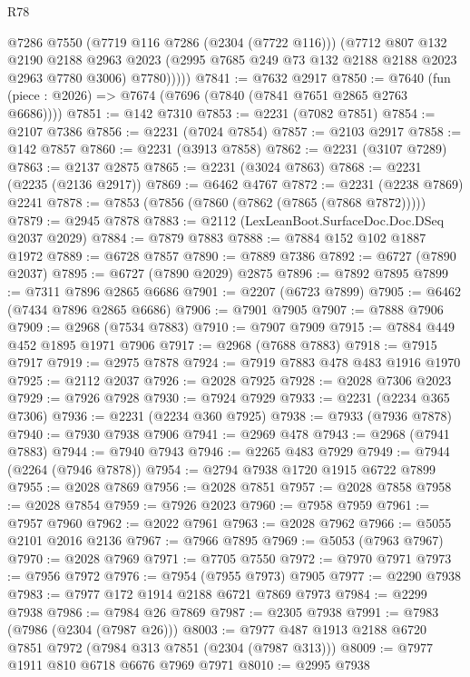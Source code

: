 \begin{lexlean}{R78}
\begin{coremodule}
            @7286
            @7550
            (@7719 @116 @7286 (@2304 (@7722 @116)))
            (@7712
              @807
              @132
              @2190
              @2188
              @2963
              @2023
              (@2995 @7685 @249 @73 @132 @2188 @2188 @2023 @2963 @7780 @3006)
              @7780)))))
@7841 := @7632 @2917
@7850 := @7640 (fun (piece : @2026) => @7674 (@7696 (@7840 (@7841 @7651 @2865 @2763 @6686))))
@7851 := @142 @7310
@7853 := @2231 (@7082 @7851)
@7854 := @2107 @7386
@7856 := @2231 (@7024 @7854)
@7857 := @2103 @2917
@7858 := @142 @7857
@7860 := @2231 (@3913 @7858)
@7862 := @2231 (@3107 @7289)
@7863 := @2137 @2875
@7865 := @2231 (@3024 @7863)
@7868 := @2231 (@2235 (@2136 @2917))
@7869 := @6462 @4767
@7872 := @2231 (@2238 @7869) @2241
@7878 := @7853 (@7856 (@7860 (@7862 (@7865 (@7868 @7872)))))
@7879 := @2945 @7878
@7883 := @2112 (LexLeanBoot.SurfaceDoc.Doc.DSeq @2037 @2029)
@7884 := @7879 @7883
@7888 := @7884 @152 @102 @1887 @1972
@7889 := @6728 @7857
@7890 := @7889 @7386
@7892 := @6727 (@7890 @2037)
@7895 := @6727 (@7890 @2029) @2875
@7896 := @7892 @7895
@7899 := @7311 @7896 @2865 @6686
@7901 := @2207 (@6723 @7899)
@7905 := @6462 (@7434 @7896 @2865 @6686)
@7906 := @7901 @7905
@7907 := @7888 @7906
@7909 := @2968 (@7534 @7883)
@7910 := @7907 @7909
@7915 := @7884 @449 @452 @1895 @1971 @7906
@7917 := @2968 (@7688 @7883)
@7918 := @7915 @7917
@7919 := @2975 @7878
@7924 := @7919 @7883 @478 @483 @1916 @1970
@7925 := @2112 @2037
@7926 := @2028 @7925
@7928 := @2028 @7306 @2023
@7929 := @7926 @7928
@7930 := @7924 @7929
@7933 := @2231 (@2234 @365 @7306)
@7936 := @2231 (@2234 @360 @7925)
@7938 := @7933 (@7936 @7878)
@7940 := @7930 @7938 @7906
@7941 := @2969 @478
@7943 := @2968 (@7941 @7883)
@7944 := @7940 @7943
@7946 := @2265 @483 @7929
@7949 := @7944 (@2264 (@7946 @7878))
@7954 := @2794 @7938 @1720 @1915 @6722 @7899
@7955 := @2028 @7869
@7956 := @2028 @7851
@7957 := @2028 @7858
@7958 := @2028 @7854
@7959 := @7926 @2023
@7960 := @7958 @7959
@7961 := @7957 @7960
@7962 := @2022 @7961
@7963 := @2028 @7962
@7966 := @5055 @2101 @2016 @2136
@7967 := @7966 @7895
@7969 := @5053 (@7963 @7967)
@7970 := @2028 @7969
@7971 := @7705 @7550
@7972 := @7970 @7971
@7973 := @7956 @7972
@7976 := @7954 (@7955 @7973) @7905
@7977 := @2290 @7938
@7983 := @7977 @172 @1914 @2188 @6721 @7869 @7973
@7984 := @2299 @7938
@7986 := @7984 @26 @7869
@7987 := @2305 @7938
@7991 := @7983 (@7986 (@2304 (@7987 @26)))
@8003 := @7977 @487 @1913 @2188 @6720 @7851 @7972 (@7984 @313 @7851 (@2304 (@7987 @313)))
@8009 := @7977 @1911 @810 @6718 @6676 @7969 @7971
@8010 := @2995 @7938

\end{coremodule}
\end{lexlean}
